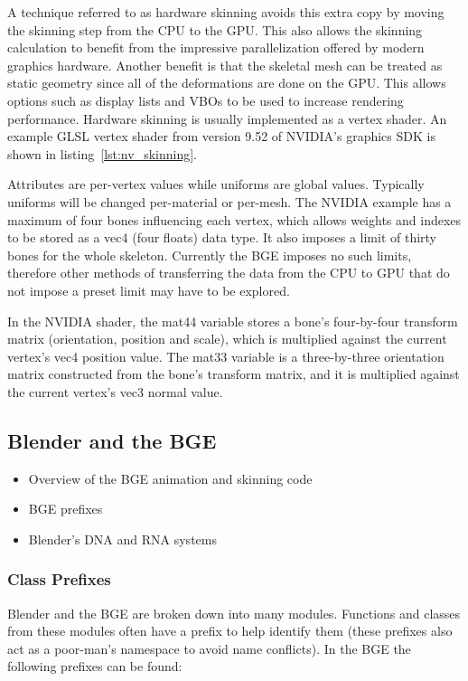A technique referred to as hardware skinning avoids this extra copy by moving the skinning step from the CPU to the GPU.
This also allows the skinning calculation to benefit from the impressive parallelization offered by modern graphics hardware.
Another benefit is that the skeletal mesh can be treated as static geometry since all of the deformations are done on the GPU.
This allows options such as display lists and VBOs to be used to increase rendering performance.
Hardware skinning is usually implemented as a vertex shader.
An example GLSL vertex shader from version 9.52 of NVIDIA's graphics SDK\cite{nvidiasdk} is shown in listing~\ref{lst:nv_skinning}.


Attributes are per-vertex values while uniforms are global values.
Typically uniforms will be changed per-material or per-mesh.
The NVIDIA example has a maximum of four bones influencing each vertex, which allows weights and indexes to be stored as a vec4 (four floats) data type.
It also imposes a limit of thirty bones for the whole skeleton.
Currently the BGE imposes no such limits, therefore other methods of transferring the data from the CPU to GPU that do not impose a preset limit may have to be explored.

In the NVIDIA shader, the mat44 variable stores a bone's four-by-four transform matrix (orientation, position and scale), which is multiplied against the current vertex's vec4 position value.
The mat33 variable is a three-by-three orientation matrix constructed from the bone's transform matrix, and it is multiplied against the current vertex's vec3 normal value.

\subsection{Blender and the BGE}
\ifsummaries
\begin{itemize}
 \item Overview of the BGE animation and skinning code
 \item BGE prefixes
 \item Blender's DNA and RNA systems
\end{itemize}
\fi

\subsubsection{Class Prefixes}
Blender and the BGE are broken down into many modules.
Functions and classes from these modules often have a prefix to help identify them (these prefixes also act as a poor-man's namespace to avoid name conflicts).
In the BGE the following prefixes can be found:

